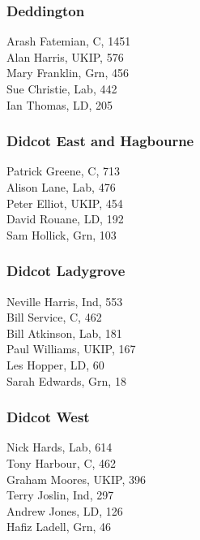 \documentclass[a4paper,openany,10pt]{book}
\begin{document}
\subsubsection*{Deddington}



Arash Fatemian, C, 1451\\
Alan Harris, UKIP, 576\\
Mary Franklin, Grn, 456\\
Sue Christie, Lab, 442\\
Ian Thomas, LD, 205\\


\subsubsection*{Didcot East and Hagbourne}



Patrick Greene, C, 713\\
Alison Lane, Lab, 476\\
Peter Elliot, UKIP, 454\\
David Rouane, LD, 192\\
Sam Hollick, Grn, 103\\


\subsubsection*{Didcot Ladygrove}



Neville Harris, Ind, 553\\
Bill Service, C, 462\\
Bill Atkinson, Lab, 181\\
Paul Williams, UKIP, 167\\
Les Hopper, LD, 60\\
Sarah Edwards, Grn, 18\\


\subsubsection*{Didcot West}



Nick Hards, Lab, 614\\
Tony Harbour, C, 462\\
Graham Moores, UKIP, 396\\
Terry Joslin, Ind, 297\\
Andrew Jones, LD, 126\\
Hafiz Ladell, Grn, 46\\
\end{document}
